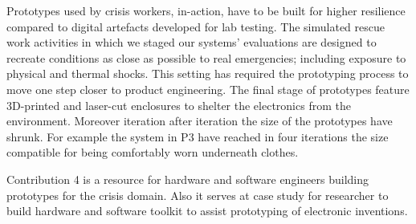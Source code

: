 Prototypes used by crisis workers, in-action, have to be built for
higher resilience compared to digital artefacts developed for lab
testing. The simulated rescue work activities in which we staged our
systems' evaluations are designed to recreate conditions as close as
possible to real emergencies; including exposure to physical and thermal
shocks. This setting has required the prototyping process to move one
step closer to product engineering. The final stage of prototypes
feature 3D-printed and laser-cut enclosures to shelter the electronics
from the environment. Moreover iteration after iteration the size of the
prototypes have shrunk. For example the system in P3 have reached in
four iterations the size compatible for being comfortably worn
underneath clothes.

Contribution 4 is a resource for hardware and software engineers
building prototypes for the crisis domain. Also it serves at case study
for researcher to build hardware and software toolkit to assist
prototyping of electronic inventions.
